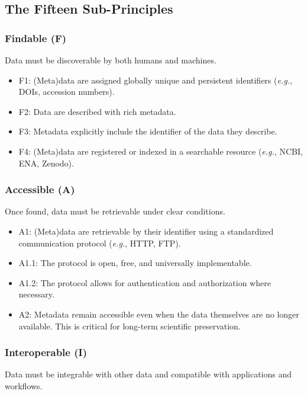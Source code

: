 \subsection{The Fifteen Sub-Principles}

\subsubsection{Findable (F)}

Data must be discoverable by both humans and machines.

\begin{itemize}
\item F1: (Meta)data are assigned globally unique and persistent identifiers (\textit{e.g.}, DOIs, accession numbers).
\item F2: Data are described with rich metadata.
\item F3: Metadata explicitly include the identifier of the data they describe.
\item F4: (Meta)data are registered or indexed in a searchable resource (\textit{e.g.}, NCBI, ENA, Zenodo).
\end{itemize}

\subsubsection{Accessible (A)}

Once found, data must be retrievable under clear conditions.

\begin{itemize}
\item A1: (Meta)data are retrievable by their identifier using a standardized communication protocol (\textit{e.g.}, HTTP, FTP).
\item A1.1: The protocol is open, free, and universally implementable.
\item A1.2: The protocol allows for authentication and authorization where necessary.
\item A2: Metadata remain accessible even when the data themselves are no longer available. This is critical for long-term scientific preservation.
\end{itemize}

\subsubsection{Interoperable (I)}

Data must be integrable with other data and compatible with applications and workflows.

